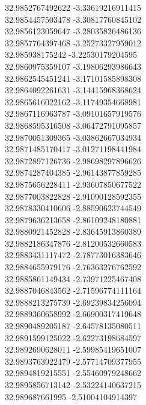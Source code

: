 {32.9852767492622	-3.33619216911415\\
32.9854457503478	-3.30817760845102\\
32.9856123059647	-3.28035826486136\\
32.9857764397468	-3.25273327959012\\
32.985938175242	-3.22530179204595\\
32.9860975359107	-3.19806293986643\\
32.9862545451241	-3.17101585898308\\
32.9864092261631	-3.14415968368624\\
32.9865616022162	-3.11749354668981\\
32.9867116963787	-3.09101657919576\\
32.9868595316508	-3.06472791095857\\
32.9870051309365	-3.03862667034934\\
32.9871485170417	-3.01271198441984\\
32.9872897126736	-2.98698297896626\\
32.9874287404385	-2.96143877859285\\
32.9875656228411	-2.93607850677522\\
32.9877003822828	-2.91090128592355\\
32.9878330410606	-2.88590623744549\\
32.9879636213658	-2.86109248180881\\
32.9880921452828	-2.83645913860389\\
32.9882186347876	-2.81200532660583\\
32.9883431117472	-2.78773016383646\\
32.9884655979176	-2.76363276762592\\
32.9885861149434	-2.73971225467408\\
32.9887046843562	-2.71596774111164\\
32.9888213275739	-2.69239834256094\\
32.9889360658992	-2.66900317419648\\
32.9890489205187	-2.64578135080511\\
32.9891599125022	-2.62273198684597\\
32.9892690628011	-2.59985419651007\\
32.9893763922479	-2.57714709377955\\
32.9894819215551	-2.55460979248662\\
32.9895856713142	-2.53224140637215\\
32.989687661995	-2.51004104914397\\
}
